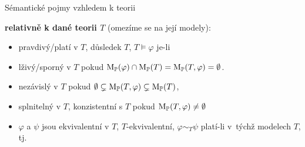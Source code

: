 \documentclass{beamer}
\begin{document}
\begin{frame}{Sémantické pojmy vzhledem k teorii}

    \textbf{relativně k dané teorii $T$} (omezíme se na její modely):
    \begin{itemize}
        \item \alert{pravdivý/platí v $T$}, \alert{důsledek $T$}, \alert{$T \models \varphi$} je-li 
        \item \alert{lživý/sporný v $T$} pokud $\operatorname{M}_\mathbb P(\varphi)\cap\operatorname{M}_\mathbb P(T)=\operatorname{M}_\mathbb P(T,\varphi)=\emptyset$.
        \item \alert{nezávislý v $T$} pokud $\emptyset\subsetneq\operatorname{M}_\mathbb P(T,\varphi)\subsetneq\operatorname{M}_\mathbb P(T)$,
        \item \alert{splnitelný v $T$}, \alert{konzistentní s $T$} pokud $\operatorname{M}_\mathbb P(T,\varphi)\neq\emptyset$ %
        \pause
        \item $\varphi$ a $\psi$ jsou \alert{ekvivalentní v $T$}, \alert{$T$-ekvivalentní}, \alert{$\varphi\sim_T\psi$} platí-li v~týchž modelech $T$, tj. 
    \end{itemize}

    \pause

\end{frame}
\end{document}
